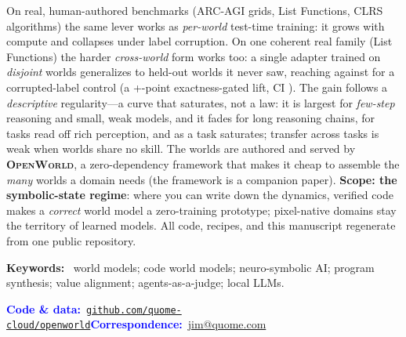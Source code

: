 \documentclass[11pt]{article}
\newcommand{\openworld}{\textsc{OpenWorld}}
\begin{document}
\begin{tcolorbox}[breakable, enhanced, colback=white, colframe=black!12,
  arc=3pt, boxrule=0.5pt, left=18pt, right=16pt, top=5pt, bottom=5pt,
  borderline west={3pt}{0pt}{cardblue}, drop fuzzy shadow=black!18]
\smallskip\noindent
On real, human-authored benchmarks (ARC-AGI grids, List Functions, CLRS
algorithms) the same lever works as \emph{per-world} test-time training: it grows with compute
and collapses under label corruption. On one coherent real family (List Functions) the harder
\emph{cross-world} form works too: a single adapter trained on \CrossWorldNTrain{} \emph{disjoint}
worlds generalizes to held-out worlds it never saw, reaching \CrossWorldMean{} against \CrossWorldCorrupt{}
for a corrupted-label control (a \mbox{+\CrossWorldGap}-point exactness-gated lift, CI
\CrossWorldGapCI). The gain follows a \emph{descriptive} regularity---a
curve that saturates, not a law: it is largest for \emph{few-step} reasoning and small, weak
models, and it fades for long reasoning chains, for tasks read off rich perception, and as a
task saturates; transfer across tasks is weak when worlds share no skill.
The worlds are authored and served by \textbf{\openworld}, a zero-dependency framework that makes
it cheap to assemble the \emph{many} worlds a domain needs (the framework is a companion paper).
\textbf{Scope: the symbolic-state regime}: where you can write down the dynamics, verified code makes a
\emph{correct} world model a zero-training prototype; pixel-native domains stay the territory of
learned models. All code, recipes, and this manuscript regenerate from one public repository.

\smallskip
\noindent\textbf{Keywords:}~%
world models; code world models; neuro-symbolic AI; program synthesis;
value alignment; agents-as-a-judge; local LLMs.

\smallskip
\noindent\textcolor{blue}{\textbf{Code \& data:}}~\href{https://github.com/quome-cloud/openworld}{\texttt{github.com/quome-cloud/openworld}}\quad\textcolor{blue}{\textbf{Correspondence:}}~\href{mailto:jim@quome.com}{jim@quome.com}
\end{tcolorbox}
\clearpage

\end{document}
